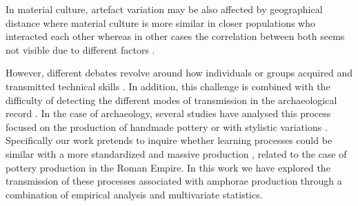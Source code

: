 \documentclass[review]{elsarticle}
\begin{document}
In material culture, artefact variation may be also affected by geographical distance \citep{bjorklund_effect_2010,shennan_isolation-by-distance_2015, van_strien_isolation-by-distance_2015} where material culture is more similar in closer populations who interacted each other whereas in other cases the correlation between both seems not visible due to different factors \citep{hart_effects_2012}. 



However, different debates revolve around how individuals or groups acquired and transmitted technical skills \citep{bowser_learning_2008, mesoudi_cultural_2008}. In addition, this challenge is combined with the difficulty of detecting the different modes of transmission in the archaeological record \citep{roux_standardization_2015}. In the case of archaeology, several studies have analysed this process focused on the production of handmade pottery \citep{steele_james_ceramic_2010} or with stylistic variations \citep{neiman_stylistic_1995, shennan_ceramic_2001}.
Specifically our work pretends to inquire whether learning processes could be similar with a more standardized and massive production \citep{gandon_copying_2014}, related to the case of pottery production in the Roman Empire. In this work we have explored the transmission of these processes associated with amphorae production through a combination of empirical analysis and multivariate statistics.
                     
\end{document}
